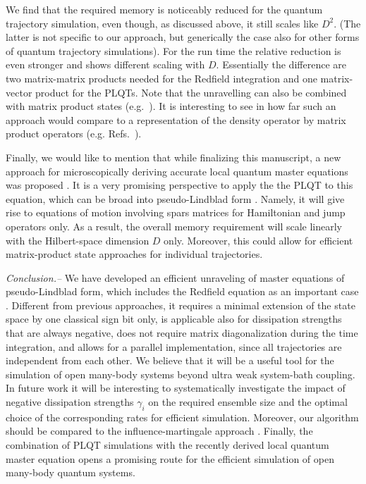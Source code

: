 \documentclass[twocolumn,prl,superscriptaddress]{revtex4-2}
\begin{document}
We find that the required memory is noticeably reduced for the quantum trajectory simulation, even though, as discussed above, it still scales like $D^2$. (The latter is not specific to our approach, but generically the case also for other forms of quantum trajectory simulations). For the run time the relative reduction is even stronger and shows different scaling with $D$. Essentially the difference are two matrix-matrix products needed for the Redfield integration and one matrix-vector product for the PLQTs. 
Note that the unravelling can also be combined with matrix product states (e.g.~\cite{Verstraete_2008,USchollwoeck2011}). It is interesting to see in how far such an approach would compare to a representation of the density operator by matrix product operators (e.g. Refs.~\cite{XXuJThinga2019,Weimer2021}).

Finally, we would like to mention that while finalizing this manuscript, a new approach for microscopically deriving accurate local quantum master equations was proposed \cite{schnellGlobalBecomesLocal2023}. It is a very promising perspective to apply the the PLQT to this equation, which can be broad into pseudo-Lindblad form \cite{schnellGlobalBecomesLocal2023}. Namely, it will give rise to equations of motion involving spars matrices for Hamiltonian and jump operators only. As a result, the overall memory requirement will scale linearly with the Hilbert-space dimension $D$ only. Moreover, this could allow for efficient matrix-product state approaches for individual trajectories. 

\textit{Conclusion.--} We have developed an efficient unraveling of master equations of pseudo-Lindblad form, which includes the Redfield equation as an important case \cite{TBecker2021}. Different from previous approaches, it requires a minimal extension of the state space by one classical sign bit only, is applicable also for dissipation strengths that are always negative, does not require matrix diagonalization during the time integration, and allows for a parallel implementation, since all trajectories are independent from each other. We believe that it will be a useful tool for the simulation of open many-body systems beyond ultra weak system-bath coupling. In future work it will be interesting to systematically investigate the impact of negative dissipation strengths $\gamma_i$ on the required ensemble size and the optimal choice of the corresponding rates for efficient simulation. Moreover, our algorithm should be compared to the influence-martingale approach \cite{DonvilMGinanneschi2022}. Finally, the combination of PLQT simulations with the recently derived local quantum master equation \cite{schnellGlobalBecomesLocal2023} opens a promising route for the efficient simulation of open many-body quantum systems. 
\end{document}

